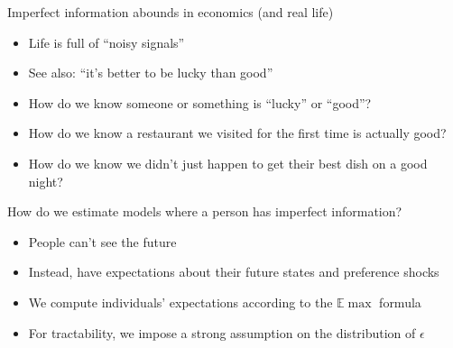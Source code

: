 \documentclass[aspectratio=169]{beamer}
\begin{document}
\begin{frame}

Imperfect information abounds in economics (and real life)

\bigskip{}

\begin{itemize}
\itemsep1.5em
\item<2-> Life is full of ``noisy signals''
\item<3-> See also: ``it's better to be lucky than good''
\item<4-> How do we know someone or something is ``lucky'' or ``good''?
\item<5-> How do we know a restaurant we visited for the first time is actually good?
\item<6-> How do we know we didn't just happen to get their best dish on a good night?
\end{itemize}

\end{frame}

\begin{frame}

How do we estimate models where a person has imperfect information?

\bigskip{}


\bigskip{}

\begin{itemize}
\itemsep1.5em
\item<3-> People can't see the future
\item<4-> Instead, have expectations about their future states and preference shocks
\item<5-> We compute individuals' expectations according to the $\mathbb{E}\max$ formula
\item<6-> For tractability, we impose a strong assumption on the distribution of $\epsilon$
\end{itemize}

\end{frame}
\end{document}
